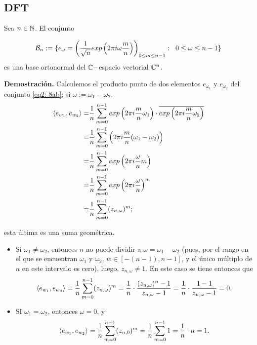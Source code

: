 


\subsection{DFT}




\begin{prop}
Sea $n \in \mathbb{N}$. El conjunto

\begin{equation}
\label{eq2: 8ab}
\mathcal{B}_{n} : = \{
e_{\omega} = \left(
\frac{1}{\sqrt{n}} exp \left(
2 \pi i \omega \frac{m}{n}
\right)
\right)_{0 \leq m \leq n-1}
: \hspace{0.2cm} 0 \leq \omega \leq n-1
 \}
\end{equation}
es una base ortonormal del $\mathbb{C}-$espacio
vectorial $\mathbb{C}^{n}$.
\end{prop}

\noindent
\textbf{Demostración.}
Calculemos el producto punto de dos elementos
$e_{\omega_{1}}$ y $e_{\omega_{2}}$ del conjunto \eqref{eq2: 8ab};
si $\omega := \omega_{1}-\omega_{2}$,
\begin{align*}
\langle e_{w_{1}}, e_{w_{2}} \rangle = &
\frac{1}{n}
\sum\limits_{m=0}^{n-1}exp \left( 2 \pi i \frac{m}{n} \omega_{1} \right)
\cdot \overline{ exp \left( 2 \pi i \frac{m}{n} \omega_{2} \right) } \\
= & \frac{1}{n}
\sum\limits_{m=0}^{n-1}\left( 2 \pi i \frac{m}{n} (\omega_{1}-\omega_{2}) \right) \\
= & \frac{1}{n}\sum\limits_{m=0}^{n-1}exp\left( 2 \pi i \frac{\omega}{n} m \right) \\
= & \frac{1}{n}\sum\limits_{m=0}^{n-1}exp\left( 2 \pi i \frac{\omega}{n}  \right)^{m} \\
= & \frac{1}{n}\sum\limits_{m=0}^{n-1}(z_{n, \omega})^{m};
\end{align*}

\noindent
esta última es una suma geométrica. 
\begin{itemize}
	\item Si $\omega_{1} \neq \omega_{2}$, entonces $n$ no puede dividir 
	a $\omega = \omega_{1}-\omega_{2}$ (pues, por el rango en el que se encuentran
	$\omega_{1}$ y $\omega_{2}$, $w \in [-(n-1), n-1]$, y el único múltiplo
	de $n$ en este intervalo es cero), luego, $z_{n, \omega} \neq 1$.
	En este caso se tiene entonces que 
	\[
	\langle e_{w_{1}}, e_{w_{2}} \rangle = 
	\frac{1}{n}\sum\limits_{m=0}^{n-1}(z_{n, \omega})^{m}
	= \frac{1}{n} \cdot \frac{(z_{n, \omega})^{n}-1}{z_{n, \omega}-1}=
	\frac{1}{n} \cdot \frac{1-1}{z_{n, \omega}-1}=0.
	\]
	
	\item SI $\omega_{1} = \omega_{2}$, entonces $\omega = 0$, y
	\[
	\langle e_{w_{1}}, e_{w_{2}} \rangle = 
	\frac{1}{n}\sum\limits_{m=0}^{n-1}(z_{n, 0})^{m}
	= \frac{1}{n}\sum\limits_{m=0}^{n-1}1 = \frac{1}{n} \cdot n = 1.
	\]
\end{itemize}

